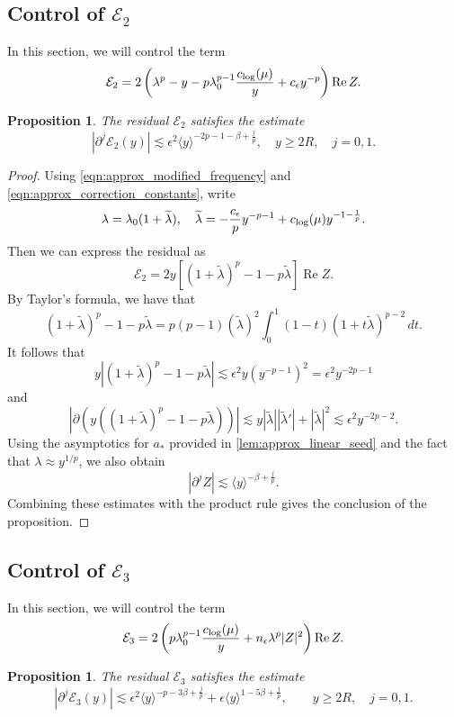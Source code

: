 \documentclass[11pt]{amsart}
\newtheorem{proposition}[theorem]{Proposition}
\theoremstyle{definition}
\theoremstyle{remark}
\numberwithin{equation}{section}
\newcommand{\sq}[1]{\widetilde{#1}}
\newcommand{\mc}[1]{\mathcal{#1}}
\newcommand{\ang}[1]{\langle #1 \rangle}
\begin{document}
\subsection{Control of \texorpdfstring{$\mc{E}_2$}{E2}}

In this section, we will control the term
\[\mc{E}_2 = 2\left(\lambda^p-y-p\lambda_0^{p-1}\frac{c_{\textup{log}}(\mu)}{y}+c_\epsilon y^{-p}\right)\operatorname{Re}Z.\]

\begin{proposition}\label{prop:approx_E2}
    The residual $\mc{E}_2$ satisfies the estimate
    \[|\partial^j \mc{E}_2(y)| \lesssim \epsilon^2 \ang{y}^{-2p - 1 - \beta + \frac{j}{p}}, \quad y \geq 2R, \quad j = 0,1.\]
\end{proposition}

\begin{proof}
    Using \eqref{eqn:approx_modified_frequency} and \eqref{eqn:approx_correction_constants}, write 
    \[\lambda = \lambda_0(1 + \sq{\lambda}), \quad \sq{\lambda} = -\frac{c_\epsilon}{p}y^{-p - 1} + c_{\textup{log}}(\mu)y^{-1 - \frac{1}{p}}.\]
    Then we can express the residual as
    \[\mc{E}_2 = 2y[(1 + \sq{\lambda})^p - 1 - p\sq{\lambda}]\operatorname{Re}Z.\]
    By Taylor's formula, we have that
    \[(1 + \sq{\lambda})^p - 1 - p\sq{\lambda} = p(p - 1)(\sq{\lambda})^2\int_{0}^{1}(1 - t)(1 + t \sq{\lambda})^{p - 2} \, dt.\]
    It follows that 
    \[y|(1 + \sq{\lambda})^p - 1 - p\sq{\lambda}| \lesssim \epsilon^2 y(y^{-p-1})^{2} = \epsilon^2 y^{-2p - 1}\]
    and
    \[|\partial(y((1 + \sq{\lambda})^p - 1 - p\sq{\lambda}))| \lesssim y|\sq{\lambda}||\sq{\lambda}'| +  |\sq{\lambda}|^2 \lesssim \epsilon^2 y^{-2p-2}.\]
    Using the asymptotics for $a_*$ provided in \cref{lem:approx_linear_seed} and the fact that $\lambda \approx y^{1/p}$, we also obtain 
    \[|\partial^{j}Z| \lesssim \ang{y}^{-\beta + \frac{j}{p}}.\]
    Combining these estimates with the product rule gives the conclusion of the proposition.
\end{proof}

\subsection{Control of \texorpdfstring{$\mc{E}_3$}{E3}}

In this section, we will control the term
\[\mc{E}_3 = 2\left(p\lambda_0^{p-1}\frac{c_{\textup{log}}(\mu)}{y}
        +n_\epsilon\lambda^p|Z|^2\right)\operatorname{Re}Z.\]
\begin{proposition}\label{prop:approx_E3}
    The residual $\mc{E}_3$ satisfies the estimate
    \begin{equation}\label{eqn:approx_E3_bound}
        |\partial^j \mc{E}_3(y)|
        \lesssim \epsilon^2\ang{y}^{-p-3\beta+\frac{j}{p}}
        +\epsilon\ang{y}^{1-5\beta+\frac{j}{p}},
        \qquad y\geq2R,\quad j=0,1.
    \end{equation}
\end{proposition}
\end{document}
